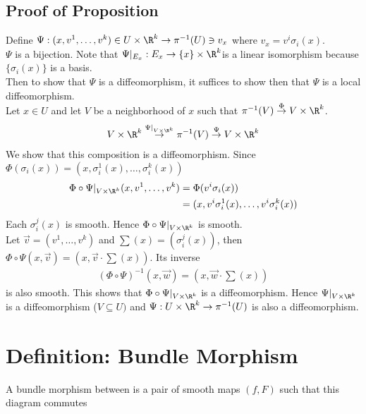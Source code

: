 \documentclass[11pt]{article}
\begin{document}
\subsection*{Proof of Proposition}
\label{sec:orgc23fc8a}
Define \(\Psi:(x,v^{1},\ldots,v^{k})\in U\times\R^{k}\to \pi^{-1}(U)\ni v_{x}\) where \(v_{x}=v^{i}\sigma_{i}(x)\).\\
\(\Psi\) is a bijection. Note that \(\Psi|_{E_{x}}:E_{x}\to\{x\}\times\R^{k}\)is a linear isomorphism because \(\{\sigma_{i}(x)\}\) is a basis.\\
Then to show that \(\Psi\) is a diffeomorphism, it suffices to show then that \(\Psi\) is a local diffeomorphism.\\
Let \(x\in U\) and let \(V\) be a neighborhood of \(x\) such that \(\pi^{-1}(V)\overset{\Phi}{\to}V\times\R^{k}\).\\
\begin{align*}
  V\times\R^{k}\overset{\Psi|_{V\times\R^{k}}}{\to}\pi^{-1}(V)\overset{\Psi}{\to}V\times\R^{k}
\end{align*}
We show that this composition is a diffeomorphism. Since \(\Phi(\sigma_{i}(x))=(x,\sigma_{i}^{1}(x),\dots,\sigma_{i}^{k}(x))\)\\
\begin{align*}
  \Phi\circ\Psi|_{V\times\R^{k}}(x,v^{1},\ldots,v^{k})
  &=\Phi(v^{i}\sigma_{i}(x)) \\
  &=(x,v^{i}\sigma_{i}^{1}(x),\ldots,v^{i}\sigma_{i}^{k}(x))
\end{align*}
Each \(\sigma_{i}^{j}(x)\) is smooth. Hence \(\Phi\circ\Psi|_{V\times\R^{k}}\) is smooth.\\
Let \(\vec{v}=(v^{1},\ldots,v^{k})\) and \(\sum(x)=(\sigma_{i}^{j}(x))\), then \(\Phi\circ\Psi(x,\vec{v})=\left( x,\vec{v}\cdot\sum(x) \right)\). Its inverse\\
\begin{align*}
  (\Phi\circ\Psi)^{-1}(x,\vec{w})=\left(x,\vec{w}\cdot\sum(x)\right)
\end{align*}
is also smooth. This shows that \(\Phi\circ\Psi|_{V\times\R^{k}}\) is a diffeomorphism. Hence \(\Psi|_{V\times\R^{k}}\) is a diffeomorphism (\(V\subseteq U)\) and \(\Psi:U\times\R^{k}\to\pi^{-1}(U)\) is also a diffeomorphism.\\
\section*{Definition: Bundle Morphism}
\label{sec:org960d4ed}
A bundle morphism between is a pair of smooth maps \((f,F)\) such that this diagram commutes\\
\end{document}
